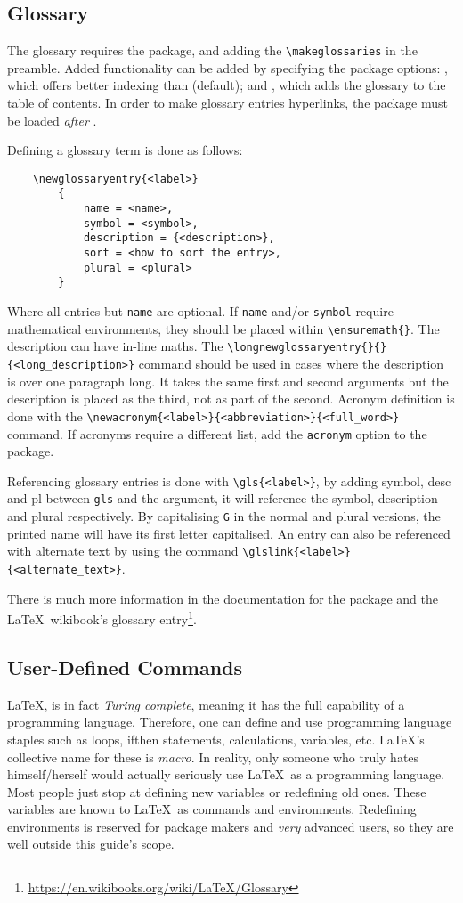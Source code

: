 \subsection{Glossary}
%
The glossary requires the  package, and adding the
\verb|\makeglossaries| in the preamble.  Added functionality can be
added by specifying the package options: , which offers
better indexing than  (default); and , which
adds the glossary to the table of contents.  In order to make glossary
entries hyperlinks, the package must be loaded \emph{after}
.

Defining a glossary term is done as follows:
\begin{verbatim}
	\newglossaryentry{<label>}
	    {
	        name = <name>,
	        symbol = <symbol>,
	        description = {<description>},
	        sort = <how to sort the entry>,
	        plural = <plural>
	    }
\end{verbatim}
Where all entries but \verb|name| are optional.  If \verb|name| and/or
\verb|symbol| require mathematical environments, they should be placed
within \verb|\ensuremath{}|.  The description can have in-line maths.
The \verb|\longnewglossaryentry{}{}{<long_description>}| command
should be used in cases where the description is over one paragraph
long. It takes the same first and second arguments but the description
is placed as the third, not as part of the second.  Acronym definition
is done with the
\verb|\newacronym{<label>}{<abbreviation>}{<full_word>}| command.  If
acronyms require a different list, add the \verb|acronym| option to
the  package.

Referencing glossary entries is done with \verb|\gls{<label>}|, by
adding symbol, desc and pl between \verb|gls| and the argument, it
will reference the symbol, description and plural respectively.  By
capitalising \verb|G| in the normal and plural versions, the printed
name will have its first letter capitalised.  An entry can also be
referenced with alternate text by using the command
\verb|\glslink{<label>}{<alternate_text>}|.

There is much more information in the documentation for the
 package and the \LaTeX~wikibook's glossary
entry\footnote{\url{https://en.wikibooks.org/wiki/LaTeX/Glossary}}.
%
\subsection{User-Defined Commands}
%
\LaTeX, is in fact \emph{Turing complete}, meaning it has the full
capability of a programming language.  Therefore, one can define and
use programming language staples such as loops, ifthen statements,
calculations, variables, etc. \LaTeX's collective name for these is
\emph{macro}.  In reality, only someone who truly hates
himself/herself would actually seriously use \LaTeX~as a programming
language.  Most people just stop at defining new variables or
redefining old ones.  These variables are known to \LaTeX~as commands
and environments.  Redefining environments is reserved for package
makers and \emph{very} advanced users, so they are well outside this
guide's scope.


